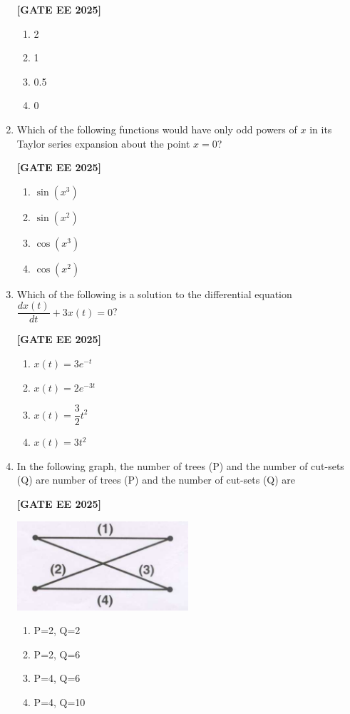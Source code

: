 \documentclass[12pt]{article}
\begin{document}
\begin{enumerate}[leftmargin=2.5em, label=\textbf{Q.\arabic*}., itemsep=2em]
\noindent \textbf{[GATE EE 2025]}
    \begin{enumerate}[label=(\Alph*)]
        \item 2
        \item 1
        \item 0.5
        \item 0
    \end{enumerate}

\item Which of the following functions would have only odd powers of $x$ in its Taylor series expansion about the point $x = 0$?
 
\noindent \textbf{[GATE EE 2025]}
    \begin{enumerate}[label=(\Alph*)]
        \item $\sin(x^3)$
        \item $\sin(x^2)$
        \item $\cos(x^3)$
        \item $\cos(x^2)$
    \end{enumerate}

\item Which of the following is a solution to the differential equation $\dfrac{dx(t)}{dt} + 3x(t) = 0$?
 
\noindent \textbf{[GATE EE 2025]}
    \begin{enumerate}[label=(\Alph*)]
        \item $x(t) = 3e^{-t}$
        \item $x(t) = 2e^{-3t}$
        \item $x(t) = \dfrac{3}{2} t^2$
        \item $x(t) = 3t^2$
    \end{enumerate}

\item In the following graph, the number of trees (P) and the number of cut-sets (Q) are
number of trees (P) and the number of cut-sets (Q) are
 
\noindent \textbf{[GATE EE 2025]}
\begin{center}
\includegraphics[width=0.5\textwidth]{figs/q7.png}
\end{center}
    \begin{enumerate}[label=(\Alph*)]
        \item P=2, Q=2
        \item P=2, Q=6
        \item P=4, Q=6
        \item P=4, Q=10
    \end{enumerate}


\end{enumerate}
\end{document}
